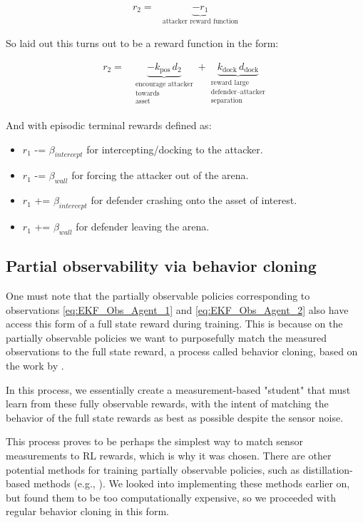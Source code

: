 \[
\boxed{
\begin{aligned}
r_2
= {}&
\underbrace{-r_1}_{\text{attacker reward function}}
\end{aligned}
}
\]

So laid out this turns out to be a reward function in the form:

\begin{equation}
\label{eq:defender_step_reward}
\boxed{
\begin{aligned}
r_2
= {}&
\underbrace{-k_{\text{pos}}\, d_2}_{\substack{\text{encourage attacker}\\\text{towards}\\\text{asset}}}
+
\underbrace{k_{\text{dock}}\, d_{\text{dock}}}_{\substack{\text{reward large}\\\text{defender--attacker}\\\text{separation}}}
\end{aligned}
}
\end{equation}

And with episodic terminal rewards defined as:

\begin{itemize}
    \item $r_1$ -= $\beta_{intercept}$ for intercepting/docking to the attacker.
    \item $r_1$ -= $\beta_{wall}$ for forcing the attacker out of the arena.
    \item $r_1$ += $\beta_{intercept}$ for defender crashing onto the asset of interest.
    \item $r_1$ += $\beta_{wall}$ for defender leaving the arena.
    
\end{itemize}

\subsection{Partial observability via behavior cloning}
\label{subsec:partial-observability-behavior-cloning}

One must note that the partially observable policies corresponding to observations \ref{eq:EKF_Obs_Agent_1} and \ref{eq:EKF_Obs_Agent_2} also have access this form of a full state reward during training. This is because on the partially observable policies we want to purposefully match the measured observations to the full state reward, a process called behavior cloning, based on the work by \cite{ross2011reduction}.

In this process, we essentially create a measurement-based "student" that must learn from these fully observable rewards, with the intent of matching the behavior of the full state rewards as best as possible despite the sensor noise.

This process proves to be perhaps the simplest way to match sensor measurements to RL rewards, which is why it was chosen. There are other potential methods for training partially observable policies, such as distillation-based methods (e.g., \cite{bajcsy2024learning}). We looked into implementing these methods earlier on, but found them to be too computationally expensive, so we proceeded with regular behavior cloning in this form.
